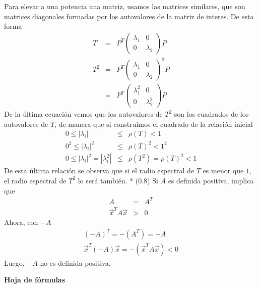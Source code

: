 \documentclass[12pt]{article}
\begin{document}
\begin{enumerate}[leftmargin=*,widest=9]
  Para elevar a una potencia una matriz, usamos las matrices similares, que son matrices diagonales formadas por los autovalores de la matriz de interes. De esta forma
  \begin{eqnarray*}
  T & = & P^T \begin{pmatrix}
  \lambda_1 & 0\\ 0 & \lambda_2
  \end{pmatrix} P\\
  T^2 & = & P^T \begin{pmatrix}
  \lambda_1 & 0\\ 0 & \lambda_2
  \end{pmatrix}^2 P\\
  & = & P^T \begin{pmatrix}
  \lambda_1^2 & 0\\ 0 & \lambda_2^2
  \end{pmatrix} P
  \end{eqnarray*}
  De la última ecuación vemos que los autovalores de \(T^2\) son los cuadrados de los autovalores de \(T\), de manera que si construimos el cuadrado de la relación inicial
  \begin{eqnarray*}
  0 \leq |\lambda_i| &\leq& \rho(T) < 1 \\
  0^2 \leq |\lambda_i|^2 &\leq& \rho(T)^2 < 1^2\\
  0 \leq |\lambda_i|^2 = |\lambda_i^2| &\leq& \rho(T^2) = \rho(T)^2 < 1
  \end{eqnarray*}
  De esta última relación se observa que si el radio espectral de \(T\) es menor que \(1\), el radio espectral de \(T^2\) lo será también.
  * (\(0.8\)) 
  Si \(A\) es definida positiva, implica que 
  \begin{eqnarray*}
  A &=& A^T\\
  \vec{x}^T A \vec{x} &>& 0
  \end{eqnarray*}
  Ahora, con \(-A\)
  \begin{eqnarray*}
  (-A)^T = -(A^T) = -A  \\
  \vec{x}^T (-A) \vec{x} = -(\vec{x}^T A \vec{x}) < 0
  \end{eqnarray*}
  Luego, \(-A\) no es definida positiva.
  \end{enumerate}
\clearpage
\begin{center}
\textbf{Hoja de fórmulas}
\end{center}
\end{document}
